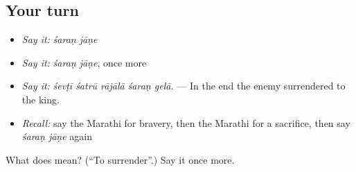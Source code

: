 \subsection*{Your turn}
\begin{itemize}
\raggedright
  \item \emph{Say it:} \emph{śaraṇ jāṇe}
  \item \emph{Say it:} \emph{śaraṇ jāṇe}, once more
  \item \emph{Say it:} \emph{śevṭī śatrū rājālā śaraṇ gelā.} — In the end the enemy surrendered to the king.
  \item \emph{Recall:} say the Marathi for bravery, then the Marathi for a sacrifice, then say \emph{śaraṇ jāṇe} again
\end{itemize}

\begin{tcolorbox}[breakable,colback=teal!4,colframe=teal!35!black,title={Before you move on}]
What does   mean? (\textquotedblleft{}To surrender\textquotedblright{}.) Say it once more.
\end{tcolorbox}
